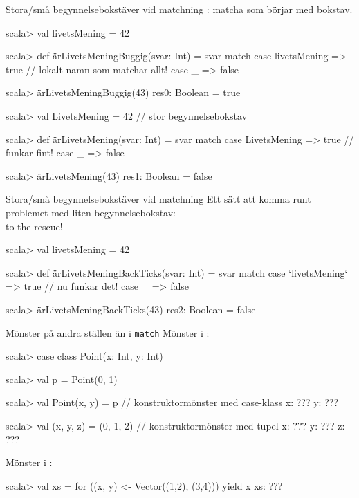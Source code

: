 \begin{Slide}{Stora/små begynnelsebokstäver vid matchning}
: matcha  som börjar med  bokstav.
\begin{REPL}
scala> val livetsMening = 42

scala> def ärLivetsMeningBuggig(svar: Int) = svar match {
         case livetsMening => true    // lokalt namn som matchar allt!
         case _ => false
       }

scala> ärLivetsMeningBuggig(43)
res0: Boolean = true

scala> val LivetsMening = 42   // stor begynnelsebokstav

scala> def ärLivetsMening(svar: Int) = svar match {
         case LivetsMening => true    // funkar fint!
         case _ => false
       }

scala> ärLivetsMening(43)
res1: Boolean = false
\end{REPL}
\end{Slide}


\begin{Slide}{Stora/små begynnelsebokstäver vid matchning}
Ett sätt att komma runt problemet med liten begynnelsebokstav: \\
 to the rescue!
\begin{REPL}
scala> val livetsMening = 42

scala> def ärLivetsMeningBackTicks(svar: Int) = svar match {
         case `livetsMening` => true    // nu funkar det!
         case _ => false
       }

scala> ärLivetsMeningBackTicks(43)
res2: Boolean = false
\end{REPL}
\end{Slide}


\begin{Slide}{Mönster på andra ställen än i \texttt{match}}\SlideFontSmall
Mönster i :
\vspace{-0.25em}\begin{REPL}
scala> case class Point(x: Int, y: Int)

scala> val p = Point(0, 1)

scala> val Point(x, y) = p          // konstruktormönster med case-klass
x: ???
y: ???

scala> val (x, y, z) = (0, 1, 2)    // konstruktormönster med tupel
x: ???
y: ???
z: ???

\end{REPL}
Mönster i :
\vspace{-0.25em}\begin{REPL}
scala> val xs = for ((x, y) <- Vector((1,2), (3,4))) yield x
xs: ???
\end{REPL}

\end{Slide}

